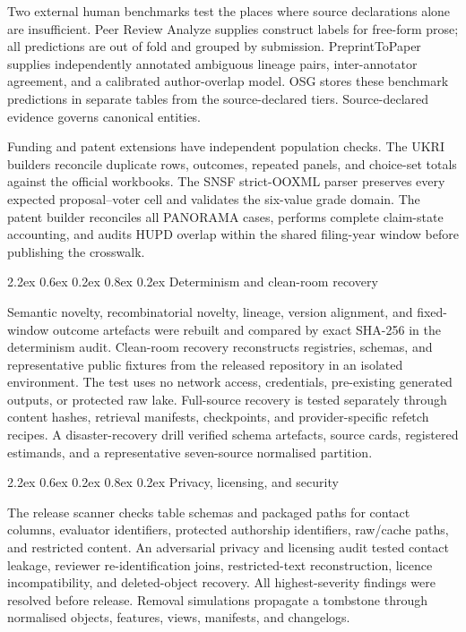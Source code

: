\documentclass[
  10pt,
]{article}
\makeatletter
\renewcommand\subsection{\@startsection{subsection}{2}{\z@}%
  {2.2ex \@plus 0.6ex \@minus 0.2ex}%
  {0.8ex \@plus 0.2ex}%
  {\normalfont\large\sffamily\bfseries\color{OSGInk}}}
\makeatother
\begin{document}
Two external human benchmarks test the places where source declarations
alone are insufficient. Peer Review Analyze supplies construct labels
for free-form prose; all predictions are out of fold and grouped by
submission. PreprintToPaper supplies independently annotated ambiguous
lineage pairs, inter-annotator agreement, and a calibrated author-overlap
model. OSG stores these benchmark predictions in separate tables from
the source-declared tiers. Source-declared evidence governs canonical
entities.

Funding and patent extensions have independent population checks. The
UKRI builders reconcile duplicate rows, outcomes, repeated panels, and
choice-set totals against the official workbooks. The SNSF strict-OOXML
parser preserves every expected proposal--voter cell and validates the
six-value grade domain. The patent builder reconciles all
\OSGClaimPatentPilotApplications{} PANORAMA
cases, performs complete claim-state accounting, and audits HUPD overlap
within the shared filing-year window before publishing the crosswalk.

\subsection{Determinism and clean-room
recovery}\label{74-determinism-and-clean-room-recovery}

Semantic novelty, recombinatorial novelty, lineage, version alignment,
and fixed-window outcome artefacts were rebuilt and compared by exact
SHA-256 in the determinism audit. Clean-room recovery reconstructs
registries, schemas, and representative public fixtures from the
released repository in an isolated environment. The test uses no
network access, credentials, pre-existing generated outputs, or
protected raw lake. Full-source recovery is tested separately through
content hashes, retrieval manifests, checkpoints, and provider-specific
refetch recipes. A disaster-recovery
drill verified \OSGClaimSchemaArtifacts{} schema artefacts,
\OSGClaimRecoverySourceCards{} source cards,
\OSGClaimRegisteredEstimands{} registered estimands, and a
representative seven-source normalised partition.

\subsection{Privacy, licensing, and
security}\label{75-privacy-licensing-and-security}

The release scanner checks table schemas and packaged paths for contact
columns, evaluator identifiers, protected authorship identifiers,
raw/cache paths, and restricted content. An adversarial privacy and
licensing audit tested contact leakage, reviewer re-identification
joins, restricted-text reconstruction, licence incompatibility, and
deleted-object recovery. All highest-severity findings were resolved
before release. Removal
simulations propagate a tombstone through normalised objects, features,
views, manifests, and changelogs.
\end{document}
